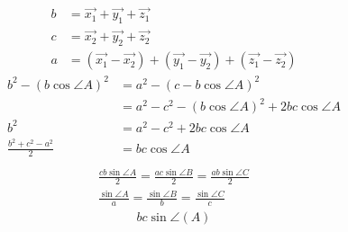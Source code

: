 \documentclass{article}
\begin{document}
  \begin{align*}
    b &= \vec{x_{1}} + \vec{y_{1}} + \vec{z_{1}}\\
    c &= \vec{x_{2}} + \vec{y_{2}} + \vec{z_{2}}\\
    a &= ( \vec{x_{1}} - \vec{x_{2}} ) + ( \vec{y_{1}} - \vec{y_{2}} ) + ( \vec{z_{1}} - \vec{z_{2}} )
  \end{align*}
  \begin{align*}
    b^{2} - ( b\cos{\angle{A}} )^{2} &= a^{2} - ( c-b\cos{\angle{A}} )^{2}\\
    &= a^{2} - c^{2} - ( b\cos{\angle{A}} )^{2} + 2bc\cos{\angle{A}}\\
    b^{2} &= a^{2} - c^{2} + 2bc\cos{\angle{A}}\\
    \frac{b^{2} + c^{2} - a^{2}}{2} &= bc\cos{\angle{A}}\\
  \end{align*}
  \begin{align*}
    \frac{cb\sin{\angle{A}}}{2} = \frac{ac\sin{\angle{B}}}{2} = \frac{ab\sin{\angle{C}}}{2}\\
    \frac{\sin{\angle{A}}}{a} = \frac{\sin{\angle{B}}}{b} = \frac{\sin{\angle{C}}}{c}
  \end{align*}
  \begin{align*}
    bc\sin{\angle(A)}
  \end{align*}
\end{document}
